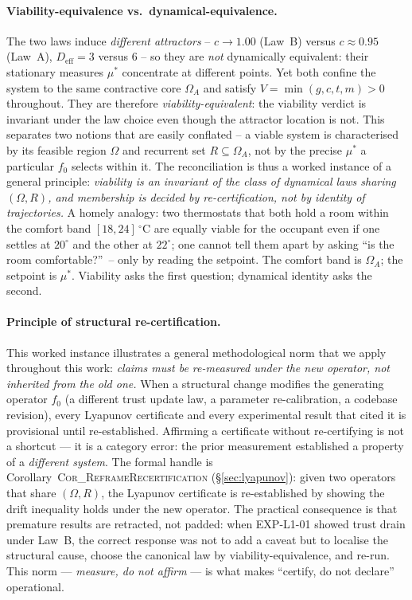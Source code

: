 \documentclass[11pt, a4paper]{article}
\begin{document}
\paragraph{Viability-equivalence vs.\ dynamical-equivalence.}
The two laws induce \emph{different attractors} -- $c\to 1.00$ (Law~B) versus
$c\approx 0.95$ (Law~A), $D_\text{eff} = 3$ versus $6$ -- so they are \emph{not}
dynamically equivalent: their stationary measures $\mu^*$ concentrate at
different points. Yet both confine the system to the same contractive core
$\Omega_A$ and satisfy $V = \min(g,c,t,m) > 0$ throughout. They are therefore
\emph{viability-equivalent}: the viability verdict is invariant under the law
choice even though the attractor location is not. This separates two notions
that are easily conflated -- a viable system is characterised by its feasible
region $\Omega$ and recurrent set $R\subseteq\Omega_A$, not by the precise
$\mu^*$ a particular $f_0$ selects within it. The reconciliation is thus a worked
instance of a general principle: \emph{viability is an invariant of the class of
dynamical laws sharing $(\Omega, R)$, and membership is decided by
re-certification, not by identity of trajectories.}
A homely analogy: two thermostats that both hold a room within the comfort band
$[18,24]\,^\circ\mathrm{C}$ are equally viable for the occupant even if one
settles at $20^\circ$ and the other at $22^\circ$; one cannot tell them apart by
asking ``is the room comfortable?''\ -- only by reading the setpoint. The comfort
band is $\Omega_A$; the setpoint is $\mu^*$. Viability asks the first question;
dynamical identity asks the second.

\paragraph{Principle of structural re-certification.}
This worked instance illustrates a general methodological norm that we
apply throughout this work: \emph{claims must be re-measured under the
new operator, not inherited from the old one.}
When a structural change modifies the generating operator $f_0$
(a different trust update law, a parameter re-calibration, a codebase
revision), every Lyapunov certificate and every experimental result
that cited it is provisional until re-established.
Affirming a certificate without re-certifying is not a shortcut --- it
is a category error: the prior measurement established a property of a
\emph{different system}.
The formal handle is Corollary~\textsc{Cor\_ReframeRecertification}
(\S\ref{sec:lyapunov}): given two operators that share $(\Omega, R)$, the
Lyapunov certificate is re-established by showing the drift inequality
holds under the new operator.
The practical consequence is that premature results are retracted, not
padded: when EXP-L1-01 showed trust drain under Law~B, the correct
response was not to add a caveat but to localise the structural cause,
choose the canonical law by viability-equivalence, and re-run.
This norm --- \emph{measure, do not affirm} --- is what makes
``certify, do not declare'' operational.
\end{document}
